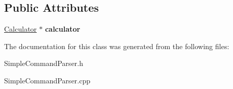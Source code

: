 \subsection*{Public Attributes}
\begin{DoxyCompactItemize}
\item 
\hypertarget{class_simple_command_parser_a89b6340ce40c9a4c444876ebdc3d0de2}{}\hyperlink{class_calculator}{Calculator} $\ast$ {\bfseries calculator}\label{class_simple_command_parser_a89b6340ce40c9a4c444876ebdc3d0de2}

\end{DoxyCompactItemize}


The documentation for this class was generated from the following files\+:\begin{DoxyCompactItemize}
\item 
Simple\+Command\+Parser.\+h\item 
Simple\+Command\+Parser.\+cpp\end{DoxyCompactItemize}
